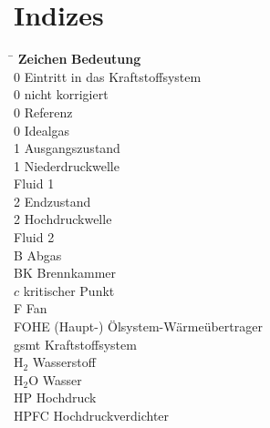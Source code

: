 \section*{Indizes}

\begin{tabbing}
	\hspace*{3cm} \= \hspace*{8cm} \kill
	\textbf{Zeichen} \> \textbf{Bedeutung} 							\\[5mm]
	0		\>	Eintritt in das Kraftstoffsystem					\\
    0		\>	nicht korrigiert					                \\
    0       \>  Referenz 						                    \\
    0       \>  Idealgas                                            \\
	1		\>	Ausgangszustand                                     \\
    1       \>  Niederdruckwelle                                    \\
     \> Fluid 1                                              \\
	2		\>	Endzustand								            \\
    2       \>  Hochdruckwelle                                      \\
     \> Fluid 2                                              \\
    B       \>  Abgas                                               \\
    BK      \>  Brennkammer                                         \\
    $c$     \>  kritischer Punkt                                    \\
    F       \>  Fan                                                 \\
    FOHE    \>  (Haupt-) Ölsystem-Wärmeübertrager                   \\
    gsmt    \>  Kraftstoffsystem                                    \\
    H$_2$   \>  Wasserstoff                                         \\
    H$_2$O  \>  Wasser                                              \\
    HP      \>  Hochdruck                                           \\
    HPFC    \>  Hochdruckverdichter                                 \\

\end{tabbing}
